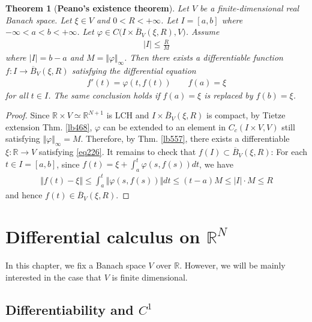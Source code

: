 \documentclass[12pt,b5paper,notitlepage]{article}
\theoremstyle{definition}
\theoremstyle{plain}
\newtheorem{thm}[df]{Theorem}
\newcommand{\ovl}{\overline}
\newcommand{\Rbb}{\mathbb R}
\numberwithin{equation}{section}
\begin{document}
\begin{thm}[\textbf{Peano's existence theorem}]
Let $V$ be a finite-dimensional real Banach space. Let $\xi\in V$ and $0<R<+\infty$. Let $I=[a,b]$ where $-\infty<a<b<+\infty$. Let $\varphi \in C\big(I\times\ovl B_V(\xi,R),V\big)$. Assume
\begin{align}
|I|\leq \frac RM  
\end{align} 
where $|I|=b-a$ and $M=\Vert\varphi\Vert_\infty$. Then there exists a differentiable function $f:I\rightarrow \ovl B_V(\xi,R)$ satisfying the differential equation
\begin{align}
f'(t)=\varphi(t,f(t))\qquad f(a)=\xi  \label{eq226}
\end{align}
for all $t\in I$. The same conclusion holds if $f(a)=\xi$ is replaced by $f(b)=\xi$.
\end{thm}


\begin{proof}
Since $\Rbb\times V\simeq \Rbb^{N+1}$ is LCH and $I\times \ovl B_V(\xi,R)$ is compact, by Tietze extension Thm. \ref{lb468}, $\varphi$ can be extended to an element in $C_c(I\times V,V)$ still satisfying $\Vert\varphi\Vert_\infty=M$. Therefore, by Thm. \ref{lb557}, there exists a differentiable $\xi:\Rbb\rightarrow V$ satisfying \eqref{eq226}. It remains to check that $f(I)\subset \ovl B_V(\xi, R)$: For each $t\in I=[a,b]$, since $f(t)=\xi+\int_a^t\varphi(s,f(s))dt$, we have
\begin{align*}
\Vert f(t)-\xi\Vert\leq\int_a^t\Vert\varphi(s,f(s))\Vert dt\leq (t-a)M\leq |I|\cdot M\leq R
\end{align*}
and hence $f(t)\in \ovl B_V(\xi,R)$.
\end{proof}


\newpage




\section{Differential calculus on $\Rbb^N$}

In this chapter, we fix a Banach space $V$ over $\Rbb$. However, we will be mainly interested in the case that $V$ is finite dimensional.


\subsection{Differentiability and $C^1$}
\end{document}
